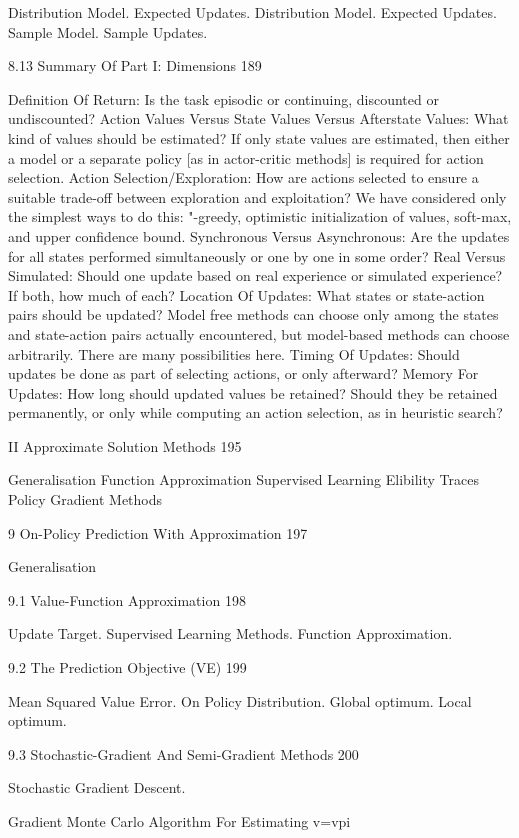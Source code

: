Distribution Model.
Expected Updates.
Distribution Model.
Expected Updates.
Sample Model.
Sample Updates.

8.13 Summary Of Part I: Dimensions 189

Definition Of Return: Is the task episodic or continuing, discounted or undiscounted?
Action Values Versus State Values Versus Afterstate Values: What kind of values should be estimated? If only state values are estimated, then either a model or a separate policy [as in actor-critic methods] is required for action selection.
Action Selection/Exploration: How are actions selected to ensure a suitable trade-off between exploration and exploitation? We have considered only the simplest ways to do this: "-greedy, optimistic initialization of values, soft-max, and upper confidence bound.
Synchronous Versus Asynchronous: Are the updates for all states performed simultaneously or one by one in some order?
Real Versus Simulated: Should one update based on real experience or simulated experience? If both, how much of each?
Location Of Updates: What states or state-action pairs should be updated? Model free methods can choose only among the states and state-action pairs actually encountered, but model-based methods can choose arbitrarily. There are many possibilities here.
Timing Of Updates: Should updates be done as part of selecting actions, or only afterward?
Memory For Updates: How long should updated values be retained? Should they be retained permanently, or only while computing an action selection, as in heuristic search?

II Approximate Solution Methods 195

Generalisation
Function Approximation
Supervised Learning
Elibility Traces
Policy Gradient Methods

9 On-Policy Prediction With Approximation 197

Generalisation

9.1 Value-Function Approximation 198

Update Target.
Supervised Learning Methods.
Function Approximation.

9.2 The Prediction Objective (VE) 199

Mean Squared Value Error.
On Policy Distribution.
Global optimum.
Local optimum.

9.3 Stochastic-Gradient And Semi-Gradient Methods 200

Stochastic Gradient Descent.

Gradient Monte Carlo Algorithm For Estimating v=vpi

